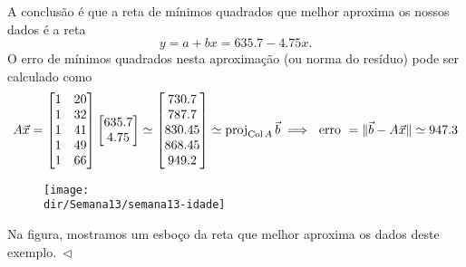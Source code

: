 \documentclass[../livro.tex]{subfiles}  %
\providecommand{\dir}{..}
\begin{document}
\begin{example}
  A conclusão é que a reta de mínimos quadrados que melhor aproxima os nossos dados é a reta
  \[
  y = a + b x = 635.7 - 4.75 x.
  \] O erro de mínimos quadrados nesta aproximação (ou norma do resíduo) pode ser calculado como
  \[
  A \vec{x} = \begin{bmatrix}
    1 & 20 \\
    1 & 32 \\
    1 & 41 \\
    1 & 49 \\
    1 & 66 \\
  \end{bmatrix}
  \begin{bmatrix}
    635.7 \\
    4.75 \\
  \end{bmatrix} \simeq
  \begin{bmatrix}
    730.7 \\
    787.7 \\
    830.45 \\
    868.45 \\
    949.2 \\
  \end{bmatrix} \simeq \operatorname{proj}_{\operatorname{Col} A} \vec{b} \implies \text{ erro } = \| \vec{b} - A\vec{x} \| \simeq 947.3
  \]
  \begin{figure}[h!]
    \begin{center}
      \texttt{[image: \\dir/Semana13/semana13-idade]}
    \end{center}
  \end{figure}
 Na figura, mostramos um esboço da reta que melhor aproxima os dados deste exemplo$. \ \lhd$
\end{example}
\end{document}
